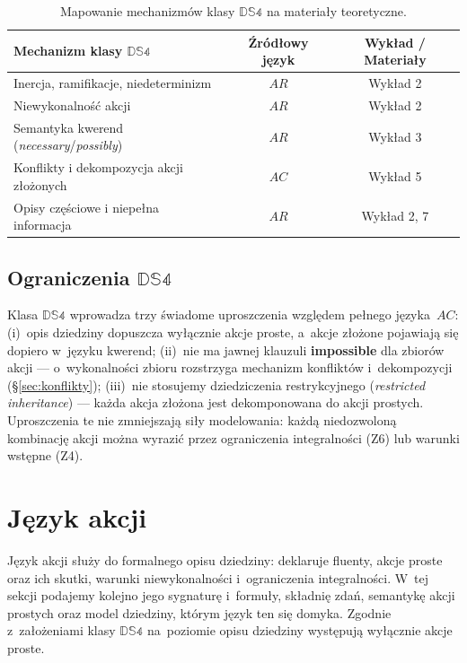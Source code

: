 \documentclass[11pt,a4paper]{article}
\newcommand{\impossible}{\textbf{impossible}}
\theoremstyle{definition}
\begin{document}
\begin{table}[h!]
\centering
\caption{Mapowanie mechanizmów klasy $\mathbb{DS4}$ na materiały teoretyczne.}
\label{tab:mapowanie_ds4}
\begin{tabular}{|l|c|c|}
\hline
\textbf{Mechanizm klasy $\mathbb{DS4}$} & \textbf{Źródłowy język} & \textbf{Wykład / Materiały} \\ \hline
Inercja, ramifikacje, niedeterminizm & $AR$ & Wykład 2 \\ \hline
Niewykonalność akcji & $AR$ & Wykład 2 \\ \hline
Semantyka kwerend (\textit{necessary}/\textit{possibly}) & $AR$ & Wykład 3 \\ \hline
Konflikty i dekompozycja akcji złożonych & $AC$ & Wykład 5 \\ \hline
Opisy częściowe i niepełna informacja & $AR$ & Wykład 2, 7 \\ \hline
\end{tabular}
\end{table}

\subsection{Ograniczenia \texorpdfstring{$\mathbb{DS4}$}{DS4}}

Klasa $\mathbb{DS4}$ wprowadza trzy świadome uproszczenia względem pełnego języka~$AC$: (i)~opis dziedziny dopuszcza wyłącznie akcje proste, a~akcje złożone pojawiają się dopiero w~języku kwerend; (ii)~nie ma jawnej klauzuli \impossible{} dla zbiorów akcji --- o~wykonalności zbioru rozstrzyga mechanizm konfliktów i~dekompozycji (\S\ref{sec:konflikty}); (iii)~nie stosujemy dziedziczenia restrykcyjnego (\textit{restricted inheritance}) --- każda akcja złożona jest dekomponowana do akcji prostych. Uproszczenia te nie zmniejszają siły modelowania: każdą niedozwoloną kombinację akcji można wyrazić przez ograniczenia integralności (Z6) lub warunki wstępne (Z4).

\section{Język akcji}
\label{sec:jezyk-akcji}

Język akcji służy do formalnego opisu dziedziny: deklaruje fluenty, akcje proste oraz ich skutki, warunki niewykonalności i~ograniczenia integralności. W~tej sekcji podajemy kolejno jego sygnaturę i~formuły, składnię zdań, semantykę akcji prostych oraz model dziedziny, którym język ten się domyka. Zgodnie z~założeniami klasy $\mathbb{DS4}$ na~poziomie opisu dziedziny występują wyłącznie akcje proste.
\end{document}
